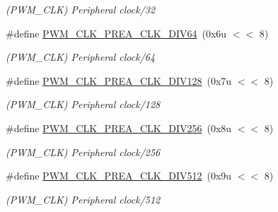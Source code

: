 \begin{DoxyCompactItemize}
\begin{DoxyCompactList}\small\item\em (P\+W\+M\+\_\+\+C\+LK) Peripheral clock/32 \end{DoxyCompactList}\item 
\mbox{\label{group__SAMV71__PWM_ga178e412966e10c888eac32104042a581}} 
\#define \mbox{\hyperlink{group__SAMV71__PWM_ga178e412966e10c888eac32104042a581}{P\+W\+M\+\_\+\+C\+L\+K\+\_\+\+P\+R\+E\+A\+\_\+\+C\+L\+K\+\_\+\+D\+I\+V64}}~(0x6u $<$$<$ 8)
\begin{DoxyCompactList}\small\item\em (P\+W\+M\+\_\+\+C\+LK) Peripheral clock/64 \end{DoxyCompactList}\item 
\mbox{\label{group__SAMV71__PWM_ga8dcee1a03b78b3780326312cee74a047}} 
\#define \mbox{\hyperlink{group__SAMV71__PWM_ga8dcee1a03b78b3780326312cee74a047}{P\+W\+M\+\_\+\+C\+L\+K\+\_\+\+P\+R\+E\+A\+\_\+\+C\+L\+K\+\_\+\+D\+I\+V128}}~(0x7u $<$$<$ 8)
\begin{DoxyCompactList}\small\item\em (P\+W\+M\+\_\+\+C\+LK) Peripheral clock/128 \end{DoxyCompactList}\item 
\mbox{\label{group__SAMV71__PWM_ga2b6c73e5a4deebd5e429bd3aaadf837b}} 
\#define \mbox{\hyperlink{group__SAMV71__PWM_ga2b6c73e5a4deebd5e429bd3aaadf837b}{P\+W\+M\+\_\+\+C\+L\+K\+\_\+\+P\+R\+E\+A\+\_\+\+C\+L\+K\+\_\+\+D\+I\+V256}}~(0x8u $<$$<$ 8)
\begin{DoxyCompactList}\small\item\em (P\+W\+M\+\_\+\+C\+LK) Peripheral clock/256 \end{DoxyCompactList}\item 
\mbox{\label{group__SAMV71__PWM_gaf721401087a93bac5aeb4bf8a9ac235e}} 
\#define \mbox{\hyperlink{group__SAMV71__PWM_gaf721401087a93bac5aeb4bf8a9ac235e}{P\+W\+M\+\_\+\+C\+L\+K\+\_\+\+P\+R\+E\+A\+\_\+\+C\+L\+K\+\_\+\+D\+I\+V512}}~(0x9u $<$$<$ 8)
\begin{DoxyCompactList}\small\item\em (P\+W\+M\+\_\+\+C\+LK) Peripheral clock/512 \end{DoxyCompactList}\item 
\mbox{\label{group__SAMV71__PWM_ga4ac8af0adc0d5842914af03ef91e93ce}} 

\end{DoxyCompactItemize}
